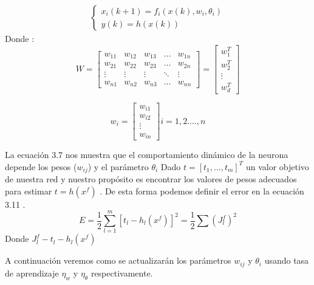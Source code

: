 \begin{equation}
\label{ECUATIONs}
\begin{aligned}
\left\lbrace
\begin{array}{ll}
x_{i}(k+1)=f_{i}(x(k),w_{i},\theta_{i}) \\
y(k)= h(x(k))
\end{array}
\right.
\end{aligned}
\end{equation}
Donde :
\begin{equation}
W=		
\begin{bmatrix}
	w_{11} & w_{12} & w_{13} & \dots  & w_{1n} \\
	w_{21} & w_{22} & w_{23} & \dots  & w_{2n} \\
	\vdots & \vdots & \vdots & \ddots & \vdots \\
	w_{n1} & w_{n2} & w_{n3} & \dots  & w_{nn}
\end{bmatrix}
=
\begin{bmatrix}
w_{1}^{T} \\
w_{2}^{T} \\
\vdots \\
w_{d}^{T}
\end{bmatrix}
\end{equation}

\begin{equation}
w_{i}=		
\begin{bmatrix}
	w_{i1}  \\
	w_{i2}  \\
	\vdots  \\
	w_{in} 
\end{bmatrix}
i=1,2 ...., n
\end{equation}

La ecuación 3.7 nos muestra que el comportamiento dinámico de la neurona depende los pesos ($w_{ij}$) y el parámetro $\theta_{i}$
Dado $t=[t_{1},...,t_{m}]^{T}$ un valor objetivo de nuestra red y nuestro propósito es encontrar los valores de pesos adecuados para estimar $ t=h(x^{f})$ . De esta forma podemos definir el error en la ecuación 3.11 .
\begin{equation}
E= \frac{1}{2} \sum_{l=1}^{m}[t_{l}-h_{l}(x^{f})]^{2}=\frac{1}{2}\sum(J_{l}^{f})^{2}
\end{equation}
Donde $J_{l}^{f}-t_{l}-h_{l}(x^{f})$ 

A continuación veremos como se actualizarán los parámetros $w_{ij}$  y $\theta_{i}$ usando tasa de aprendizaje $\eta_{w}$ y $\eta_{\theta}$ respectivamente.


